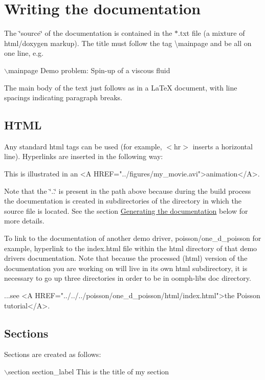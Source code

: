 \hypertarget{index_write}{}\section{Writing the documentation}\label{index_write}
The \char`\"{}source\char`\"{} of the documentation is contained in the {\ttfamily $\ast$}.{\ttfamily txt} file (a mixture of {\ttfamily html/doxygen} markup). The title must follow the tag {\ttfamily \textbackslash{}mainpage} and be all on one line, e.\+g. 
\begin{DoxyCode}
\(\backslash\)mainpage Demo problem: Spin-up of a viscous fluid
\end{DoxyCode}
 The main body of the text just follows as in a {\ttfamily La\+TeX} document, with line spacings indicating paragraph breaks.\hypertarget{index_html}{}\subsection{H\+T\+ML}\label{index_html}
Any standard html tags can be used (for example, {\ttfamily $<$hr$>$} inserts a horizontal line). Hyperlinks are inserted in the following way\+: 
\begin{DoxyCode}
This is illustrated in an <A HREF=\textcolor{stringliteral}{"../figures/my\_movie.avi"}>animation</A>.
\end{DoxyCode}
 Note that the {\ttfamily \char`\"{}..\char`\"{}} is present in the path above because during the build process the documentation is created in subdirectories of the directory in which the source file is located. See the section \hyperlink{index_generate}{Generating the documentation} below for more details.

To link to the documentation of another demo driver, {\ttfamily poisson/one\+\_\+d\+\_\+poisson} for example, hyperlink to the {\ttfamily index.\+html} file within the {\ttfamily html} directory of that demo driver\textquotesingle{}s documentation. Note that because the processed ({\ttfamily html}) version of the documentation you are working on will live in its own {\ttfamily html} subdirectory, it is necessary to go up three directories in order to be in {\ttfamily oomph-\/lib\textquotesingle{}s} {\ttfamily doc} directory. 
\begin{DoxyCode}
...see <A HREF=\textcolor{stringliteral}{"../../../poisson/one\_d\_poisson/html/index.html"}>the
Poisson tutorial</A>.
\end{DoxyCode}
\hypertarget{index_sections}{}\subsection{Sections}\label{index_sections}
Sections are created as follows\+: 
\begin{DoxyCode}
\(\backslash\)section section\_label This is the title of my section
\end{DoxyCode}


